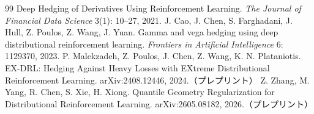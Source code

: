 \documentclass[a4paper,10pt]{jsarticle}
\theoremstyle{definition}
\begin{document}
\begin{thebibliography}{99}
Deep Hedging of Derivatives Using Reinforcement Learning. \textit{The Journal of Financial Data Science} 3(1): 10--27, 2021.
 J. Cao, J. Chen, S. Farghadani, J. Hull, Z. Poulos, Z. Wang, J. Yuan.
Gamma and vega hedging using deep distributional reinforcement learning. \textit{Frontiers in Artificial Intelligence} 6: 1129370, 2023.
 P. Malekzadeh, Z. Poulos, J. Chen, Z. Wang, K. N. Plataniotis.
EX-DRL: Hedging Against Heavy Losses with EXtreme Distributional Reinforcement Learning. arXiv:2408.12446, 2024.（プレプリント）
 Z. Zhang, M. Yang, R. Chen, S. Xie, H. Xiong.
Quantile Geometry Regularization for Distributional Reinforcement Learning. arXiv:2605.08182, 2026.（プレプリント）
\end{thebibliography}
\end{document}

